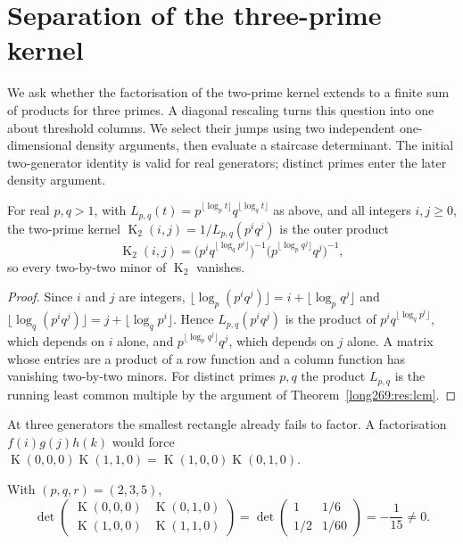 \documentclass[11pt]{article}
\theoremstyle{remark}
\theoremstyle{plain}
\newcommand{\Kernel}{\operatorname{K}}
\begin{document}
\section{Separation of the three-prime kernel}\label{long269:sec:rank}

We ask whether the factorisation of the two-prime kernel extends to a
finite sum of products for three primes. A diagonal rescaling turns this
question into one about threshold columns. We select their jumps using
two independent one-dimensional density arguments, then evaluate a
staircase determinant. The initial two-generator identity is valid for
real generators; distinct primes enter the later density argument.

\begin{proposition}\label{long269:res:two-prime-rank}
For real $p,q>1$, with $L_{p,q}(t)=p^{\lfloor\log_p t\rfloor}q^{\lfloor\log_q t\rfloor}$
as above, and all integers $i,j\ge0$, the two-prime kernel
$\Kernel_2(i,j)=1/L_{p,q}(p^iq^j)$ is the outer product
\[
 \Kernel_2(i,j)
 =\bigl(p^{i}q^{\lfloor\log_q p^{i}\rfloor}\bigr)^{-1}
  \bigl(p^{\lfloor\log_p q^{j}\rfloor}q^{j}\bigr)^{-1},
\]
so every two-by-two minor of $\Kernel_2$ vanishes.
\end{proposition}

\begin{proof}
Since $i$ and $j$ are integers,
$\lfloor\log_p(p^iq^j)\rfloor=i+\lfloor\log_p q^{j}\rfloor$ and
$\lfloor\log_q(p^iq^j)\rfloor=j+\lfloor\log_q p^{i}\rfloor$.  Hence
$L_{p,q}(p^iq^j)$ is the product of $p^{i}q^{\lfloor\log_q p^{i}\rfloor}$,
which depends on $i$ alone, and $p^{\lfloor\log_p q^{j}\rfloor}q^{j}$, which
depends on $j$ alone.  A matrix whose entries are a product of a row function
and a column function has vanishing two-by-two minors.  For distinct primes
$p,q$ the product $L_{p,q}$ is the running least common multiple by the
argument of Theorem~\ref{long269:res:lcm}.
\end{proof}


At three generators the smallest rectangle already fails to factor.  A
factorisation $f(i)g(j)h(k)$ would force
$\Kernel(0,0,0)\Kernel(1,1,0)=\Kernel(1,0,0)\Kernel(0,1,0)$.

\begin{proposition}\label{long269:res:rank}
With $(p,q,r)=(2,3,5)$,
\[
 \det\begin{pmatrix}
 \Kernel(0,0,0)&\Kernel(0,1,0)\\
 \Kernel(1,0,0)&\Kernel(1,1,0)
 \end{pmatrix}
 =\det\begin{pmatrix}1&1/6\\1/2&1/60\end{pmatrix}
 =-\frac1{15}\ne0 .
\]
\end{proposition}
\end{document}
